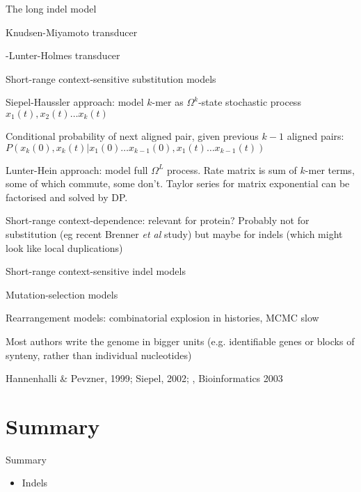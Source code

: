 \documentclass{beamer}
\begin{document}
\begin{frame}{}

\itemb
\item The long indel model
 \itemb
 \item Knudsen-Miyamoto transducer
 \item \Miklos-Lunter-Holmes transducer
 \iteme
\item Short-range context-sensitive substitution models
 \itemb
 \item Siepel-Haussler approach: model $k$-mer as $\Omega^k$-state stochastic process $x_1(t), x_2(t) \ldots x_k(t)$
  \itemb
  \item Conditional probability of next aligned pair, given previous $k-1$ aligned pairs:
$P(x_k(0),x_k(t)|x_1(0) \ldots x_{k-1}(0),x_1(t) \ldots x_{k-1}(t))$
  \iteme
 \item Lunter-Hein approach: model full $\Omega^L$ process.
Rate matrix is sum of $k$-mer terms, some of which commute, some don't.
Taylor series for matrix exponential can be factorised and solved by DP.
 \item Short-range context-dependence: relevant for protein?
Probably not for substitution (eg recent Brenner {\em et al} study)
but maybe for indels (which might look like local duplications)
 \iteme
\iteme
\end{frame}

\begin{frame}{}
\itemb
\item Short-range context-sensitive indel models
\item Mutation-selection models
\item Rearrangement models: combinatorial explosion in histories, MCMC slow
 \itemb
 \item Most authors write the genome in bigger units (e.g. identifiable genes or blocks of synteny, rather than individual nucleotides)
 \item Hannenhalli \& Pevzner, 1999; Siepel, 2002; \Miklos, Bioinformatics 2003
 \iteme
\iteme

\end{frame}




\section*{Summary}

\begin{frame}{Summary}

  \begin{itemize}
  \item Indels
  \end{itemize}

\end{frame}
\end{document}
